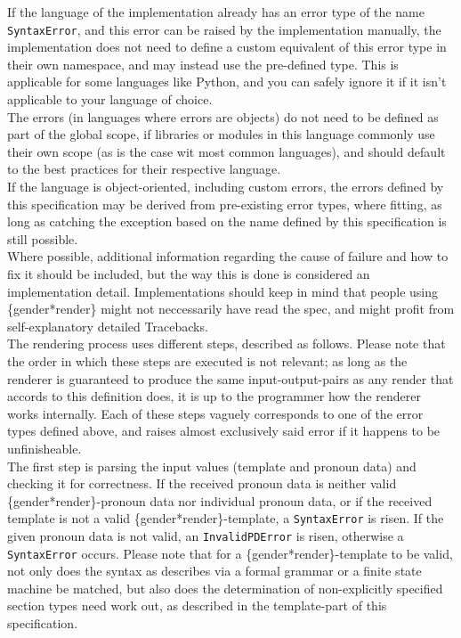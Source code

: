 \documentclass{article}
\begin{document}
    If the language of the implementation already has an error type of the name \texttt{SyntaxError}, and this error can be raised by the implementation manually, the implementation does not need to define a custom equivalent of this error type in their own namespace, and may instead use the pre-defined type.
    This is applicable for some languages like Python, and you can safely ignore it if it isn't applicable to your language of choice.\\
    The errors (in languages where errors are objects) do not need to be defined as part of the global scope, if libraries or modules in this language commonly use their own scope (as is the case wit most common languages), and should default to the best practices for their respective language.\\
    If the language is object-oriented, including custom errors, the errors defined by this specification may be derived from pre-existing error types, where fitting, as long as catching the exception based on the name defined by this specification is still possible.\\
    Where possible, additional information regarding the cause of failure and how to fix it should be included, but the way this is done is considered an implementation detail.
    Implementations should keep in mind that people using \{gender*render\} might not neccessarily have read the spec, and might profit from self-explanatory detailed Tracebacks.\\

    The rendering process uses different steps, described as follows.
    Please note that the order in which these steps are executed is not relevant;
    as long as the renderer is guaranteed to produce the same input-output-pairs as any render that accords to this definition does, it is up to the programmer how the renderer works internally.
    Each of these steps vaguely corresponds to one of the error types defined above, and raises almost exclusively said error if it happens to be unfinisheable.\\

    The first step is parsing the input values (template and pronoun data) and checking it for correctness.
    If the received pronoun data is neither valid \{gender*render\}-pronoun data nor individual pronoun data, or if the received template is not a valid \{gender*render\}-template, a \texttt{SyntaxError} is risen.
    If the given pronoun data is not valid, an \texttt{InvalidPDError} is risen, otherwise a \texttt{SyntaxError} occurs.
    Please note that for a \{gender*render\}-template to be valid, not only does the syntax as describes via a formal grammar or a finite state machine be matched, but also does the determination of non-explicitly specified section types need work out, as described in the template-part of this specification.\\
\end{document}
